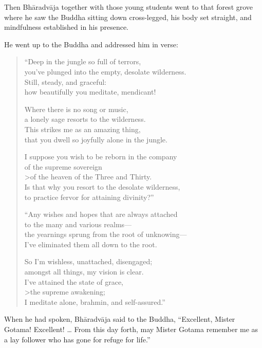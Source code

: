 \documentclass[12pt,openany]{book}%
\begin{document}
Then \textsanskrit{Bhāradvāja} together with those young students went to that forest grove where he saw the Buddha sitting down cross-legged, his body set straight, and mindfulness established in his presence. 

He went up to the Buddha and addressed him in verse: 

\begin{verse}%
“Deep in the jungle so full of terrors, \\
you’ve plunged into the empty, desolate wilderness. \\
Still, steady, and graceful: \\
how beautifully you meditate, mendicant! 

Where there is no song or music, \\
a lonely sage resorts to the wilderness. \\
This strikes me as an amazing thing, \\
that you dwell so joyfully alone in the jungle. 

I suppose you wish to be reborn in the company \\
of the supreme sovereign \\>of the heaven of the Three and Thirty. \\
Is that why you resort to the desolate wilderness, \\
to practice fervor for attaining divinity?” 

“Any wishes and hopes that are always attached \\
to the many and various realms—\\
the yearnings sprung from the root of unknowing—\\
I’ve eliminated them all down to the root. 

So I’m wishless, unattached, disengaged; \\
amongst all things, my vision is clear. \\
I’ve attained the state of grace, \\>the supreme awakening; \\
I meditate alone, brahmin, and self-assured.” 

%
\end{verse}

When he had spoken, \textsanskrit{Bhāradvāja} said to the Buddha, “Excellent, Mister Gotama! Excellent! … From this day forth, may Mister Gotama remember me as a lay follower who has gone for refuge for life.” 
\end{document}
